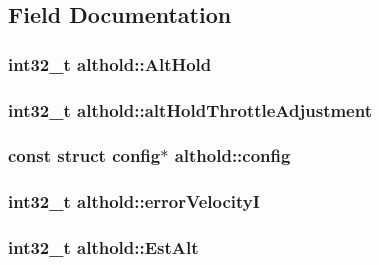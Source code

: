 \subsection{Field Documentation}
\hypertarget{structalthold_a43c5ace2baa0aad42a21fdd610c1d2cb}{
\subsubsection[{Alt\+Hold}]{\setlength{\rightskip}{0pt plus 5cm}int32\+\_\+t althold\+::\+Alt\+Hold}}\label{structalthold_a43c5ace2baa0aad42a21fdd610c1d2cb}
\hypertarget{structalthold_af70ae8bfb496aad2ca35cf4429f9cb61}{
\subsubsection[{alt\+Hold\+Throttle\+Adjustment}]{\setlength{\rightskip}{0pt plus 5cm}int32\+\_\+t althold\+::alt\+Hold\+Throttle\+Adjustment}}\label{structalthold_af70ae8bfb496aad2ca35cf4429f9cb61}
\hypertarget{structalthold_a162c43b286cb0fb6e5da3bf6cb65fc6e}{
\subsubsection[{config}]{\setlength{\rightskip}{0pt plus 5cm}const struct {\bf config}$\ast$ althold\+::config}}\label{structalthold_a162c43b286cb0fb6e5da3bf6cb65fc6e}
\hypertarget{structalthold_af3993b0fd3f98a3b5ba619e5dcbd3d1a}{
\subsubsection[{error\+Velocity\+I}]{\setlength{\rightskip}{0pt plus 5cm}int32\+\_\+t althold\+::error\+Velocity\+I}}\label{structalthold_af3993b0fd3f98a3b5ba619e5dcbd3d1a}
\hypertarget{structalthold_a96ce63b1527c61dd7f4d92319fb5777c}{
\subsubsection[{Est\+Alt}]{\setlength{\rightskip}{0pt plus 5cm}int32\+\_\+t althold\+::\+Est\+Alt}}\label{structalthold_a96ce63b1527c61dd7f4d92319fb5777c}
